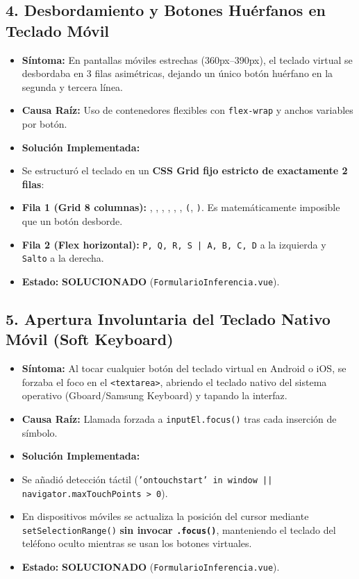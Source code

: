 \documentclass[11pt,a4paper,openany]{book}
\begin{document}
\hrulefill

\subsection{4.  Desbordamiento y Botones Huérfanos en Teclado Móvil}

\begin{itemize}[leftmargin=*]
\item \textbf{Síntoma:} En pantallas móviles estrechas (360px--390px), el teclado virtual se desbordaba en 3 filas asimétricas, dejando un único botón huérfano en la segunda y tercera línea.
\item \textbf{Causa Raíz:} Uso de contenedores flexibles con \texttt{flex-wrap} y anchos variables por botón.
\item \textbf{Solución Implementada:}
\item Se estructuró el teclado en un \textbf{CSS Grid fijo estricto de exactamente 2 filas}:
\item \textbf{Fila 1 (Grid 8 columnas):} \texttt{}, \texttt{}, \texttt{}, \texttt{}, \texttt{}, \texttt{}, \texttt{(}, \texttt{)}. Es matemáticamente imposible que un botón desborde.
\item \textbf{Fila 2 (Flex horizontal):} \texttt{P, Q, R, S | A, B, C, D} a la izquierda y \texttt{ Salto} a la derecha.
\item \textbf{Estado:}  \textbf{SOLUCIONADO} (\texttt{FormularioInferencia.vue}).
\end{itemize}

\hrulefill

\subsection{5.  Apertura Involuntaria del Teclado Nativo Móvil (Soft Keyboard)}

\begin{itemize}[leftmargin=*]
\item \textbf{Síntoma:} Al tocar cualquier botón del teclado virtual en Android o iOS, se forzaba el foco en el \texttt{<textarea>}, abriendo el teclado nativo del sistema operativo (Gboard/Samsung Keyboard) y tapando la interfaz.
\item \textbf{Causa Raíz:} Llamada forzada a \texttt{inputEl.focus()} tras cada inserción de símbolo.
\item \textbf{Solución Implementada:}
\item Se añadió detección táctil (\texttt{'ontouchstart' in window || navigator.maxTouchPoints > 0}).
\item En dispositivos móviles se actualiza la posición del cursor mediante \texttt{setSelectionRange()} \textbf{sin invocar \texttt{.focus()}}, manteniendo el teclado del teléfono oculto mientras se usan los botones virtuales.
\item \textbf{Estado:}  \textbf{SOLUCIONADO} (\texttt{FormularioInferencia.vue}).
\end{itemize}
\end{document}
